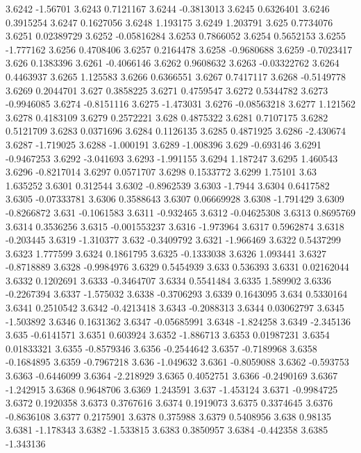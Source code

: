 3.6242  -1.56701
3.6243  0.7121167
3.6244  -0.3813013
3.6245  0.6326401
3.6246  0.3915254
3.6247  0.1627056
3.6248  1.193175
3.6249  1.203791
3.625  0.7734076
3.6251  0.02389729
3.6252  -0.05816284
3.6253  0.7866052
3.6254  0.5652153
3.6255  -1.777162
3.6256  0.4708406
3.6257  0.2164478
3.6258  -0.9680688
3.6259  -0.7023417
3.626  0.1383396
3.6261  -0.4066146
3.6262  0.9608632
3.6263  -0.03322762
3.6264  0.4463937
3.6265  1.125583
3.6266  0.6366551
3.6267  0.7417117
3.6268  -0.5149778
3.6269  0.2044701
3.627  0.3858225
3.6271  0.4759547
3.6272  0.5344782
3.6273  -0.9946085
3.6274  -0.8151116
3.6275  -1.473031
3.6276  -0.08563218
3.6277  1.121562
3.6278  0.4183109
3.6279  0.2572221
3.628  0.4875322
3.6281  0.7107175
3.6282  0.5121709
3.6283  0.0371696
3.6284  0.1126135
3.6285  0.4871925
3.6286  -2.430674
3.6287  -1.719025
3.6288  -1.000191
3.6289  -1.008396
3.629  -0.693146
3.6291  -0.9467253
3.6292  -3.041693
3.6293  -1.991155
3.6294  1.187247
3.6295  1.460543
3.6296  -0.8217014
3.6297  0.0571707
3.6298  0.1533772
3.6299  1.75101
3.63  1.635252
3.6301  0.312544
3.6302  -0.8962539
3.6303  -1.7944
3.6304  0.6417582
3.6305  -0.07333781
3.6306  0.3588643
3.6307  0.06669928
3.6308  -1.791429
3.6309  -0.8266872
3.631  -0.1061583
3.6311  -0.932465
3.6312  -0.04625308
3.6313  0.8695769
3.6314  0.3536256
3.6315  -0.001553237
3.6316  -1.973964
3.6317  0.5962874
3.6318  -0.203445
3.6319  -1.310377
3.632  -0.3409792
3.6321  -1.966469
3.6322  0.5437299
3.6323  1.777599
3.6324  0.1861795
3.6325  -0.1333038
3.6326  1.093441
3.6327  -0.8718889
3.6328  -0.9984976
3.6329  0.5454939
3.633  0.536393
3.6331  0.02162044
3.6332  0.1202691
3.6333  -0.3464707
3.6334  0.5541484
3.6335  1.589902
3.6336  -0.2267394
3.6337  -1.575032
3.6338  -0.3706293
3.6339  0.1643095
3.634  0.5330164
3.6341  0.2510542
3.6342  -0.4213418
3.6343  -0.2088313
3.6344  0.03062797
3.6345  -1.503892
3.6346  0.1631362
3.6347  -0.05685991
3.6348  -1.824258
3.6349  -2.345136
3.635  -0.6141571
3.6351  0.603924
3.6352  -1.886713
3.6353  0.01987231
3.6354  0.01833321
3.6355  -0.8579346
3.6356  -0.2544642
3.6357  -0.7189968
3.6358  -0.1684895
3.6359  -0.7967218
3.636  -1.049632
3.6361  -0.8059088
3.6362  -0.593753
3.6363  -0.6446099
3.6364  -2.218929
3.6365  0.4052751
3.6366  -0.2490169
3.6367  -1.242915
3.6368  0.9648706
3.6369  1.243591
3.637  -1.453124
3.6371  -0.9984725
3.6372  0.1920358
3.6373  0.3767616
3.6374  0.1919073
3.6375  0.3374645
3.6376  -0.8636108
3.6377  0.2175901
3.6378  0.375988
3.6379  0.5408956
3.638  0.98135
3.6381  -1.178343
3.6382  -1.533815
3.6383  0.3850957
3.6384  -0.442358
3.6385  -1.343136
